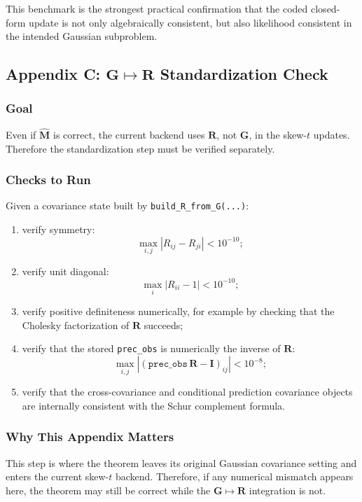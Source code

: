 \documentclass[11pt]{article}
\newcommand{\bR}{\mathbf{R}}
\newcommand{\bG}{\mathbf{G}}
\newcommand{\bM}{\mathbf{M}}
\newcommand{\I}{\mathbf{I}}
\begin{document}
This benchmark is the strongest practical confirmation that the coded
closed-form update is not only algebraically consistent, but also likelihood
consistent in the intended Gaussian subproblem.

\subsection{Appendix C: \texorpdfstring{$\bG \mapsto \bR$}{G to R} Standardization Check}

\subsubsection{Goal}

Even if \(\widehat{\bM}\) is correct, the current backend uses \(\bR\), not
\(\bG\), in the skew-$t$ updates. Therefore the standardization step must be
verified separately.

\subsubsection{Checks to Run}

Given a covariance state built by \texttt{build\_R\_from\_G(...)}:

\begin{enumerate}[label=\arabic*.]
\item verify symmetry:
\[
\max_{i,j} |R_{ij} - R_{ji}| < 10^{-10};
\]
\item verify unit diagonal:
\[
\max_i |R_{ii} - 1| < 10^{-10};
\]
\item verify positive definiteness numerically, for example by checking that the
Cholesky factorization of \(\bR\) succeeds;
\item verify that the stored \texttt{prec\_obs} is numerically the inverse of
\(\bR\):
\[
\max_{i,j} |(\texttt{prec\_obs}\,\bR - \I)_{ij}| < 10^{-8};
\]
\item verify that the cross-covariance and conditional prediction covariance
objects are internally consistent with the Schur complement formula.
\end{enumerate}

\subsubsection{Why This Appendix Matters}

This step is where the theorem leaves its original Gaussian covariance setting
and enters the current skew-$t$ backend. Therefore, if any numerical mismatch
appears here, the theorem may still be correct while the \(\bG \mapsto \bR\)
integration is not.
\end{document}
